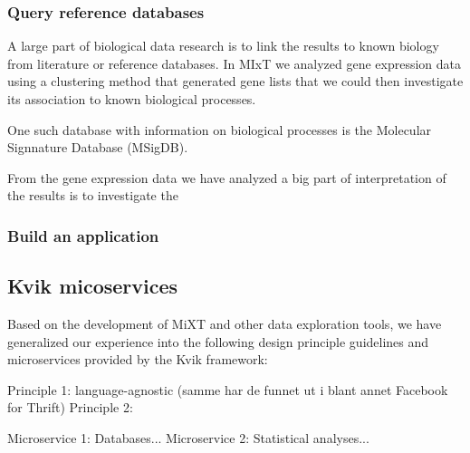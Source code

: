 

\subsubsection*{Query reference databases} 
A large part of biological data research is to link the results to known biology
from literature or reference databases. In MIxT we analyzed gene expression
data using a clustering method that generated gene lists that we could then
investigate its association to known biological processes. 

One such database with information on biological processes is the Molecular
Signnature Database (MSigDB).  


From the gene expression data we have analyzed a big part of interpretation of
the results is to investigate the 

\subsubsection*{Build an application} 

\subsection{Kvik micoservices}

Based on the development of MiXT and other data exploration tools, we have
generalized our experience into the following design principle guidelines and
microservices provided by the Kvik framework:

Principle 1: language-agnostic (samme har de funnet ut i blant annet Facebook for Thrift)
Principle 2:

Microservice 1: Databases...
Microservice 2: Statistical analyses...


